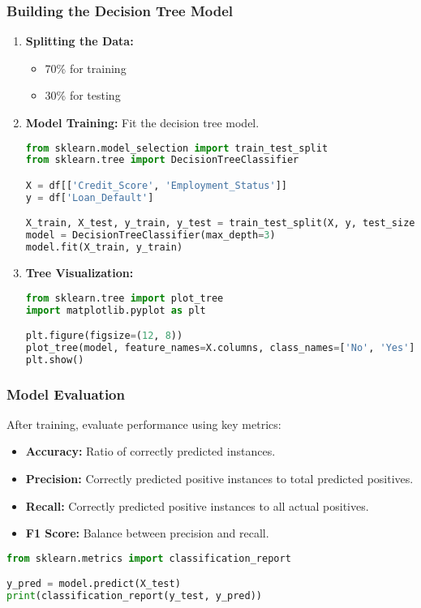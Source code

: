\documentclass[aspectratio=169]{beamer}
\begin{document}
\begin{frame}[fragile]
    \frametitle{Building the Decision Tree Model}
    \begin{enumerate}
        \item \textbf{Splitting the Data:} 
        \begin{itemize}
            \item 70\% for training
            \item 30\% for testing
        \end{itemize}
        
        \item \textbf{Model Training:} Fit the decision tree model.
        \begin{lstlisting}[language=Python]
from sklearn.model_selection import train_test_split
from sklearn.tree import DecisionTreeClassifier

X = df[['Credit_Score', 'Employment_Status']]
y = df['Loan_Default']

X_train, X_test, y_train, y_test = train_test_split(X, y, test_size=0.3, random_state=42)
model = DecisionTreeClassifier(max_depth=3)
model.fit(X_train, y_train)
        \end{lstlisting}

        \item \textbf{Tree Visualization:}
        \begin{lstlisting}[language=Python]
from sklearn.tree import plot_tree
import matplotlib.pyplot as plt

plt.figure(figsize=(12, 8))
plot_tree(model, feature_names=X.columns, class_names=['No', 'Yes'], filled=True)
plt.show()
        \end{lstlisting}
    \end{enumerate}
\end{frame}

\begin{frame}[fragile]
    \frametitle{Model Evaluation}
    After training, evaluate performance using key metrics:
    \begin{itemize}
        \item \textbf{Accuracy:} Ratio of correctly predicted instances.
        \item \textbf{Precision:} Correctly predicted positive instances to total predicted positives.
        \item \textbf{Recall:} Correctly predicted positive instances to all actual positives.
        \item \textbf{F1 Score:} Balance between precision and recall.
    \end{itemize}
    
    \begin{lstlisting}[language=Python]
from sklearn.metrics import classification_report

y_pred = model.predict(X_test)
print(classification_report(y_test, y_pred))
    \end{lstlisting}
\end{frame}
\end{document}

